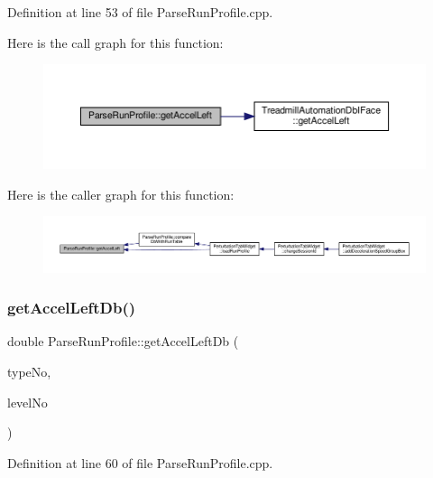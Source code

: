 Definition at line 53 of file Parse\+Run\+Profile.\+cpp.

Here is the call graph for this function\+:
\nopagebreak
\begin{figure}[H]
\begin{center}
\leavevmode
\includegraphics[width=350pt]{class_parse_run_profile_a07cda302c0032d378d1b10d0045e25be_cgraph}
\end{center}
\end{figure}
Here is the caller graph for this function\+:
\nopagebreak
\begin{figure}[H]
\begin{center}
\leavevmode
\includegraphics[width=350pt]{class_parse_run_profile_a07cda302c0032d378d1b10d0045e25be_icgraph}
\end{center}
\end{figure}
\mbox{\label{class_parse_run_profile_a482223e0ef3037dc97ae244ef1a481ae}} 
\subsubsection{\texorpdfstring{get\+Accel\+Left\+Db()}{getAccelLeftDb()}}
{\footnotesize\ttfamily double Parse\+Run\+Profile\+::get\+Accel\+Left\+Db (\begin{DoxyParamCaption}\item[{Q\+String}]{type\+No,  }\item[{Q\+String}]{level\+No }\end{DoxyParamCaption})}



Definition at line 60 of file Parse\+Run\+Profile.\+cpp.

